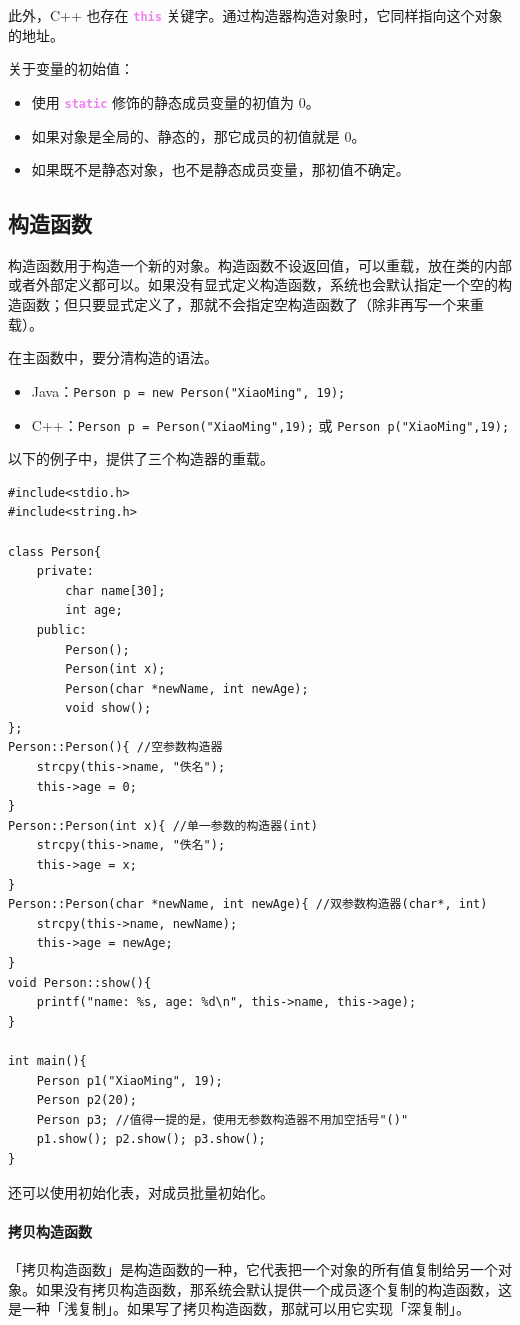 \documentclass[UTF8]{ctexart}
\newcommand\keyword[1]{\textcolor{violet}{\textbf{\texttt{#1}}}}
\begin{document}
此外，C++ 也存在 \keyword{this} 关键字。通过构造器构造对象时，它同样指向这个对象的地址。

关于变量的初始值：
\begin{itemize}[itemsep=0pt,parsep=0pt]
    \item 使用 \keyword{static} 修饰的静态成员变量的初值为 0。
    \item 如果对象是全局的、静态的，那它成员的初值就是 0。
    \item 如果既不是静态对象，也不是静态成员变量，那初值不确定。
\end{itemize}

\subsection{构造函数}
构造函数用于构造一个新的对象。构造函数不设返回值，可以重载，放在类的内部或者外部定义都可以。如果没有显式定义构造函数，系统也会默认指定一个空的构造函数；但只要显式定义了，那就不会指定空构造函数了（除非再写一个来重载）。

在主函数中，要分清构造的语法。
\begin{itemize}
  \item Java：\verb!Person p = new Person("XiaoMing", 19);!
  \item C++：\verb!Person p = Person("XiaoMing",19);! 或 \verb!Person p("XiaoMing",19);!
\end{itemize}

以下的例子中，提供了三个构造器的重载。
\begin{lstlisting}
#include<stdio.h>
#include<string.h>

class Person{
	private:
		char name[30];
		int age;
	public:
		Person();
		Person(int x);
		Person(char *newName, int newAge);
		void show();
};
Person::Person(){ //空参数构造器
	strcpy(this->name, "佚名");
	this->age = 0;
}
Person::Person(int x){ //单一参数的构造器(int)
	strcpy(this->name, "佚名");
	this->age = x;
}
Person::Person(char *newName, int newAge){ //双参数构造器(char*, int)
	strcpy(this->name, newName);
	this->age = newAge;
}
void Person::show(){
	printf("name: %s, age: %d\n", this->name, this->age);
}

int main(){
	Person p1("XiaoMing", 19);
	Person p2(20);
	Person p3; //值得一提的是，使用无参数构造器不用加空括号"()"
	p1.show(); p2.show(); p3.show();
}
\end{lstlisting}

还可以使用初始化表，对成员批量初始化。

\paragraph{拷贝构造函数} 「拷贝构造函数」是构造函数的一种，它代表把一个对象的所有值复制给另一个对象。如果没有拷贝构造函数，那系统会默认提供一个成员逐个复制的构造函数，这是一种「浅复制」。如果写了拷贝构造函数，那就可以用它实现「深复制」。
\end{document}
